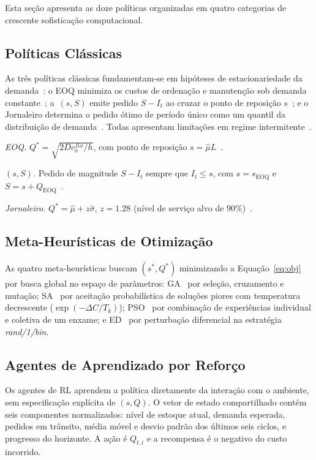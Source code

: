 \documentclass[a4paper,11pt]{article}
\begin{document}
Esta seção apresenta as doze políticas organizadas em quatro
categorias de crescente sofisticação computacional.

\subsection{Políticas Clássicas}

As três políticas clássicas fundamentam-se em hipóteses de
estacionariedade da demanda~\citep{silver:2017}: o EOQ minimiza
os custos de ordenação e manutenção sob demanda constante~\citep{harris:1913};
a~$(s,S)$ emite pedido $S-I_t$ ao cruzar o ponto de reposição
$s$~\citep{hadley:1963}; e o Jornaleiro determina o pedido ótimo
de período único como um quantil da distribuição de
demanda~\citep{cachon:2009}. Todas apresentam limitações em regime
intermitente~\citep{silver:2017}.

\emph{EOQ.} $Q^* = \sqrt{2 D c_o^{fix} / h}$, com ponto de
reposição $s = \hat{\mu} L$~\citep{harris:1913}.

\emph{$(s,S)$.} Pedido de magnitude $S - I_t$ sempre que
$I_t \leq s$, com $s = s_\text{EOQ}$ e
$S = s + Q_\text{EOQ}$~\citep{hadley:1963}.

\emph{Jornaleiro.} $Q^* = \hat{\mu} + z\hat{\sigma}$,
$z = 1.28$ (nível de serviço alvo de $90\%$)~\citep{cachon:2009}.

\subsection{Meta-Heurísticas de Otimização}

As quatro meta-heurísticas buscam $(s^*, Q^*)$ minimizando a
Equação~\eqref{eq:obj} por busca global no espaço de parâmetros:
GA~\citep{holland:1975} por seleção, cruzamento e mutação;
SA~\citep{kirkpatrick:1983} por aceitação probabilística de soluções
piores com temperatura decrescente ($\exp(-\Delta C / T_k)$);
PSO~\citep{kennedy:1995} por combinação de experiências individual
e coletiva de um enxame; e ED~\citep{storn:1997} por perturbação
diferencial na estratégia \textit{rand/1/bin}.

\subsection{Agentes de Aprendizado por Reforço}

Os agentes de RL aprendem a política diretamente da interação com
o ambiente, sem especificação explícita de $(s, Q)$. O vetor de
estado compartilhado contém seis componentes normalizados: nível de
estoque atual, demanda esperada, pedidos em trânsito, média móvel e
desvio padrão dos últimos seis ciclos, e progresso do horizonte.
A ação é $Q_{t,i}$ e a recompensa é o negativo do custo incorrido.
\end{document}
